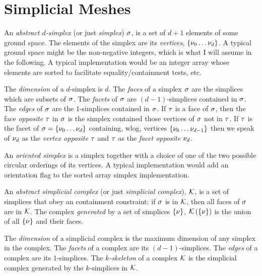
\section{Simplicial Meshes}
\label{sec:simplicial-meshes}

An {\it abstract $d$-simplex} (or just {\it simplex})
$\sigma$, is a set of $d+1$ elements of some ground space.
The elements of the simplex are its {\it vertices}, $\{ \nu_0 \ldots \nu_d \}$.
A typical ground space might be the non-negative integers,
which is what I will assume in the following.
A typical implementation would be an integer array
whose elements are sorted to facilitate equality/containment tests, etc.

The {\it dimension} of a $d$-simplex is $d$.
The {\it faces} of a simplex $\sigma$ are the simplices which are subsets of $\sigma$.
The {\it facets} of $\sigma$ are $(d-1)$-simplices contained in $\sigma$.
The {\it edges} of $\sigma$ are the $1$-simplices contained in $\sigma$.
If $\tau$ is a face of $\sigma$,
then the face {\it opposite} $\tau$ in $\sigma$
is the simplex contained those vertices of $\sigma$
not in $\tau$.
If $\tau$ is the facet of $\sigma = \{ \nu_0 \ldots \nu_d \}$
containing, wlog, vertices $\{ \nu_0 \ldots \nu_{d-1} \}$
then we speak of $\nu_d$ as the {\it vertex opposite} $\tau$
and $\tau$ as the {\it facet opposite} $\nu_d$.

An {\it oriented simplex} is a simplex together with a choice
of one of the two possible circular orderings of its vertices.
A typical implementation would add an orientation flag
to the sorted array simplex implementation.

An {\it abstract simplicial complex} (or just {\it simplicial complex}),
$\mathcal{K}$, is a set of simplices
that obey an containment constraint:
if $\sigma$ is in $\mathcal{K}$, then all faces of $\sigma$ are in $\mathcal{K}$.
The complex {\it generated} by a set of simplices $\{ \nu \}$,
$\mathcal{K} \left( \{ \nu \} \right)$ is the union of all $\{ \nu \}$
and their faces.

The {\it dimension} of a simplicial complex is the maximum dimension
of any simplex in the complex.
The {\it facets} of a complex are its $(d-1)$-simplices.
The {\it edges} of a complex are its $1$-simplices.
The {\it $k$-skeleton} of a complex $\mathcal{K}$
is the simplicial complex generated by the $k$-simplices in $\mathcal{K}$.

